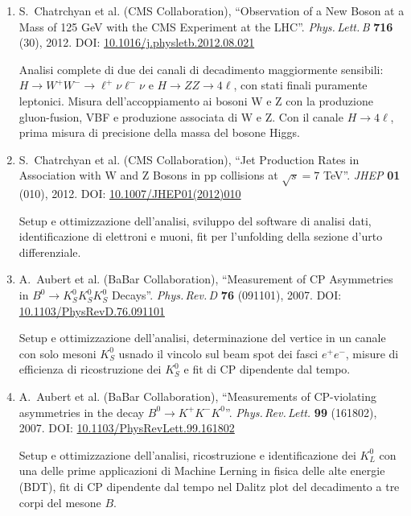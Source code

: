 \documentclass[11pt,twoside,a4paper]{article}
\begin{document}
\begin{enumerate}
\item S.~Chatrchyan et al. (CMS Collaboration), ``Observation of a New
  Boson at a Mass of 125 GeV with the CMS Experiment at the LHC''.
  \textit{Phys.\,Lett.\,B} \textbf{716} (30), 2012. DOI:
  \href{https://www.sciencedirect.com/science/article/pii/S0370269312008581}{10.1016/j.physletb.2012.08.021}

  Analisi complete di due dei canali di decadimento maggiormente
  sensibili: $H \to W^+W^-\to \ell^+\nu\ell^-\nu$ e $H\to ZZ\to 4\ell$, con
  stati finali puramente leptonici. Misura dell'accoppiamento ai
  bosoni W e Z con la produzione gluon-fusion, VBF e produzione
  associata di W e Z. Con il canale $H\to4\ell$, prima misura di
  precisione della massa del bosone Higgs.

\item S.~Chatrchyan et al. (CMS Collaboration), ``Jet Production Rates
  in Association with W and Z Bosons in pp collisions at $\sqrt{s}=7$
  TeV''. \textit{JHEP} \textbf{01} (010), 2012. DOI:
  \href{https://link.springer.com/article/10.1007/JHEP01(2012)010}{10.1007/JHEP01(2012)010}

  Setup e ottimizzazione dell'analisi, sviluppo del software di
  analisi dati, identificazione di elettroni e muoni, fit per
  l'unfolding della sezione d'urto differenziale.

\item A.~Aubert et al. (BaBar Collaboration), ``Measurement of CP
  Asymmetries in $B^0 \to K^0_{S} K^0_{S} K^0_{S}$
  Decays''. \textit{Phys.\,Rev.\,D} \textbf{76} (091101), 2007. DOI:
  \href{https://journals.aps.org/prd/abstract/10.1103/PhysRevD.76.091101}{10.1103/PhysRevD.76.091101}

  Setup e ottimizzazione dell'analisi, determinazione del vertice in
  un canale con solo mesoni $K^0_S$ usnado il vincolo sul beam spot
  dei fasci $e^+e^-$, misure di efficienza di ricostruzione dei
  $K^0_S$ e fit di CP dipendente dal tempo.

\item A.~Aubert et al. (BaBar Collaboration), ``Measurements of
  CP-violating asymmetries in the decay $B^0 \to K^{+} K^{-}
  K^0$''. \textit{Phys.\,Rev.\,Lett.} \textbf{99} (161802), 2007. DOI:
  \href{https://journals.aps.org/prl/abstract/10.1103/PhysRevLett.99.161802}{10.1103/PhysRevLett.99.161802}

  Setup e ottimizzazione dell'analisi, ricostruzione e identificazione
  dei $K^0_L$ con una delle prime applicazioni di Machine Lerning in
  fisica delle alte energie (BDT), fit di CP dipendente dal tempo nel
  Dalitz plot del decadimento a tre corpi del mesone $B$.
    
\end{enumerate}
\end{document}
